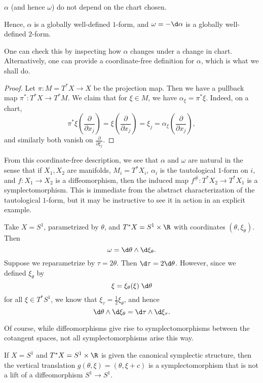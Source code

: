 \documentclass[a4paper]{article}
\begin{document}
\begin{prop}
  $\alpha$ (and hence $\omega$) do not depend on the chart chosen.
\end{prop}
Hence, $\alpha$ is a globally well-defined $1$-form, and $\omega = -\d \alpha$ is a globally well-defined $2$-form.

One can check this by inspecting how $\alpha$ changes under a change in chart. Alternatively, one can provide a coordinate-free definition for $\alpha$, which is what we shall do.

\begin{proof}
  Let $\pi: M = T^*X \to X$ be the projection map. Then we have a pullback map $\pi^*: T^*X \to T^* M$. We claim that for $\xi \in M$, we have $\alpha_\xi = \pi^* \xi$. Indeed, on a chart,
  \[
    \pi^* \xi\left( \frac{\partial}{\partial x_j}\right) = \xi\left(\frac{\partial}{\partial x_j}\right) = \xi_j = \alpha_\xi \left(\frac{\partial}{\partial x_j}\right),
  \]
  and similarly both vanish on $\frac{\partial}{\partial \xi_j}$.
\end{proof}

From this coordinate-free description, we see that $\alpha$ and $\omega$ are natural in the sense that if $X_1, X_2$ are manifolds, $M_i = T^* X_i$, $\alpha_i$ is the tautological $1$-form on $i$, and $f: X_1 \to X_2$ is a diffeomorphism, then the induced map $f^\#: T^*X_2 \to T^* X_1$ is a symplectomorphism. This is immediate from the abstract characterization of the tautological $1$-form, but it may be instructive to see it in action in an explicit example.
\begin{eg}
  Take $X = S^1$, parametrized by $\theta$, and $T^* X = S^1 \times \R$ with coordinates $(\theta, \xi_\theta)$. Then
  \[
    \omega = \d \theta \wedge \d \xi_\theta.
  \]
  Suppose we reparametrize by $\tau = 2 \theta$. Then $\d \tau = 2 \d \theta$. However, since we defined $\xi_\theta$ by
  \[
    \xi = \xi_\theta(\xi) \;\d \theta
  \]
  for all $\xi \in T^* S^1$, we know that $\xi_\tau = \frac{1}{2} \xi_\theta$, and hence
  \[
    \d \theta \wedge \d \xi_\theta = \d \tau \wedge \d \xi_\tau.
  \]
\end{eg}

Of course, while diffeomorphisms give rise to symplectomorphisms between the cotangent spaces, not all symplectomorphisms arise this way.
\begin{eg}
  If $X = S^1$ and $T^* X = S^1 \times \R$ is given the canonical symplectic structure, then the vertical translation $g(\theta, \xi) = (\theta, \xi + c)$ is a symplectomorphism that is not a lift of a diffeomorphism $S^1 \to S^1$.
\end{eg}
\end{document}
